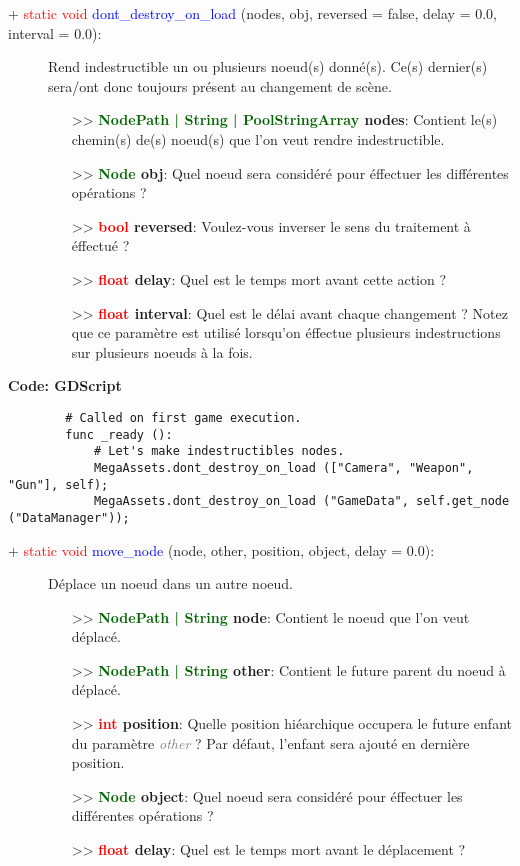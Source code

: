 \documentclass[a4paper, 11pt]{article}
\begin{document}
	\begin{description}
		\item [+ \textcolor{red}{static void} \textcolor{blue}{dont\_destroy\_on\_load} (nodes, obj,
		reversed = false, delay = 0.0, interval = 0.0):] Rend indestructible un ou plusieurs noeud(s) 
		donné(s). Ce(s) dernier(s) sera/ont donc toujours présent au changement de scène.
		\begin{itemize}
			\item [>> \textbf{\textcolor{darkgreen}{NodePath | String | PoolStringArray} nodes}:] Contient
			le(s) chemin(s) de(s) noeud(s) que l'on veut rendre indestructible.
			\item [>> \textbf{\textcolor{darkgreen}{Node} obj}:] Quel noeud sera considéré pour éffectuer
			les différentes opérations ?
			\item [>> \textbf{\textcolor{red}{bool} reversed}:] Voulez-vous inverser le sens du traitement à 
			éffectué ?
			\item [>> \textbf{\textcolor{red}{float} delay}:] Quel est le temps mort avant cette action ?
			\item [>> \textbf{\textcolor{red}{float} interval}:] Quel est le délai avant chaque changement ?
			Notez que ce paramètre est utilisé lorsqu'on éffectue plusieurs indestructions sur plusieurs 
			noeuds à la fois.\\
		\end{itemize}
	\end{description}
	\textbf{Code: GDScript}
	\begin{lstlisting}
		# Called on first game execution.
		func _ready ():
			# Let's make indestructibles nodes.
			MegaAssets.dont_destroy_on_load (["Camera", "Weapon", "Gun"], self);
			MegaAssets.dont_destroy_on_load ("GameData", self.get_node ("DataManager"));
	\end{lstlisting}
	\begin{description}
		\item [+ \textcolor{red}{static void} \textcolor{blue}{move\_node} (node, other, position, object, 
		delay = 0.0):] Déplace un noeud dans un autre noeud.
		\begin{itemize}
			\item [>> \textbf{\textcolor{darkgreen}{NodePath | String} node}:] Contient le noeud que l'on 
			veut déplacé.
			\item [>> \textbf{\textcolor{darkgreen}{NodePath | String} other}:] Contient le future parent du 
			noeud à déplacé.
			\item [>> \textbf{\textcolor{red}{int} position}:] Quelle position hiéarchique occupera le 
			future enfant du paramètre \textit{\textcolor{gray}{other}} ? Par défaut, l'enfant sera ajouté 
			en dernière position.
			\item [>> \textbf{\textcolor{darkgreen}{Node} object}:] Quel noeud sera considéré pour éffectuer
			les différentes opérations ?
			\item [>> \textbf{\textcolor{red}{float} delay}:] Quel est le temps mort avant le déplacement ?
			\\
		\end{itemize}
	\end{description}
\end{document}
